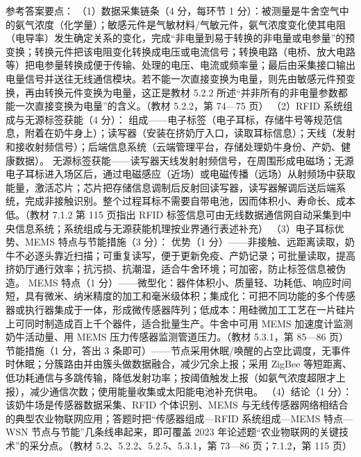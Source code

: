 \documentclass[a4paper,11pt]{article}
\begin{document}
\q 参考答案要点：
（1）数据采集链条（4 分，每环节 1 分）：被测量是牛舍空气中的氨气浓度（化学量）；敏感元件是气敏材料/气敏元件，氨气浓度变化使其电阻（电导率）发生确定关系的变化，完成“非电量到易于转换的非电量或电参量”的预变换；转换元件把该电阻变化转换成电压或电流信号；转换电路（电桥、放大电路等）把电参量转换成便于传输、处理的电压、电流或频率量；最后由采集接口输出电量信号并送往无线通信模块。若不能一次直接变换为电量，则先由敏感元件预变换，再由转换元件变换为电量，这正是教材 5.2.2 所述“并非所有的非电量参数都能一次直接变换为电量”的含义。（教材 5.2.2，第 74—75 页）
（2）RFID 系统组成与无源标签获能（4 分）：
组成——电子标签（电子耳标，存储牛号等规范信息，附着在奶牛身上）；读写器（安装在挤奶厅入口，读取耳标信息）；天线（发射和接收射频信号）；后端信息系统（云端管理平台，存储处理奶牛身份、产奶、健康数据）。
无源标签获能——读写器天线发射射频信号，在周围形成电磁场；无源电子耳标进入场区后，通过电磁感应（近场）或电磁传播（远场）从射频场中获取能量，激活芯片；芯片把存储信息调制后反射回读写器，读写器解调后送后端系统，完成非接触识别。整个过程耳标不需要自带电池，因而体积小、寿命长、成本低。（教材 7.1.2 第 115 页指出 RFID 标签信息可由无线数据通信网自动采集到中央信息系统；系统组成与无源获能机理按业界通行表述补充）
（3）电子耳标优势、MEMS 特点与节能措施（3 分）：
优势（1 分）——非接触、远距离读取，奶牛不必逐头靠近扫描；可重复读写，便于更新免疫、产奶记录；可批量读取，提高挤奶厅通行效率；抗污损、抗潮湿，适合牛舍环境；可加密，防止标签信息被伪造。
MEMS 特点（1 分）——微型化：器件体积小、质量轻、功耗低、响应时间短，具有微米、纳米精度的加工和毫米级体积；集成化：可把不同功能的多个传感器或执行器集成于一体，形成微传感器阵列；低成本：用硅微加工工艺在一片硅片上可同时制造成百上千个器件，适合批量生产。牛舍中可用 MEMS 加速度计监测奶牛活动量、用 MEMS 压力传感器监测管道压力。（教材 5.3.1，第 85—86 页）
节能措施（1 分，答出 3 条即可）——节点采用休眠/唤醒的占空比调度，无事件时休眠；分簇路由并由簇头做数据融合，减少冗余上报；采用 ZigBee 等短距离、低功耗通信与多跳传输，降低发射功率；按阈值触发上报（如氨气浓度超限才上报），减少通信次数；使用能量收集或太阳能电池补充供电。
（4）结论（1 分）：该奶牛场是传感器数据采集、RFID 个体识别、MEMS 与无线传感器网络相结合的典型农业物联网应用；答题时把“传感器组成—RFID 系统组成—MEMS 特点—WSN 节点与节能”几条线串起来，即可覆盖 2023 年论述题“农业物联网的关键技术”的采分点。（教材 5.2、5.2.2、5.2.5、5.3.1，第 73—86 页；7.1.2，第 115 页）
\end{document}
